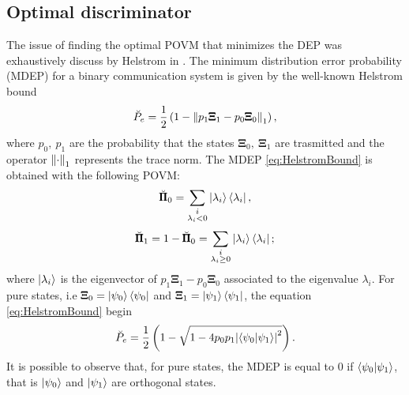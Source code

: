     \subsection{Optimal discriminator}
    The issue of finding the optimal POVM that minimizes the DEP was exhaustively discuss  by Helstrom in 
    \cite{helstrom3,helstrom4}. The minimum distribution error probability (MDEP) for a binary 
    communication system is given by the well-known Helstrom bound
    \begin{equation}
        \breve{P}_e = \frac{1}{2} \left(1-\norm{p_1 \pmb{\Xi}_1 - p_0 \pmb{\Xi}_0}_1 \right),
        \label{eq:HelstromBound}
    \end{equation}
    where $p_0,\ p_1$ are the probability that the states $\pmb{\Xi}_0,\ \pmb{\Xi}_1$ are trasmitted
    and the operator $\norm{\cdot}_1$ represents the trace norm. 
    The MDEP \ref{eq:HelstromBound} is obtained with the following POVM:
    \begin{equation}
        \breve{\pmb{\Pi}}_0 = \sum_{\substack{i \\ \lambda_i<0}} \ket{\lambda_i}\bra{\lambda_i},
    \end{equation}
    \begin{equation*}
        \breve{\pmb{\Pi}}_1 = 1-\breve{\pmb{\Pi}}_0 = 
        \sum_{\substack{i \\ \lambda_i \geq 0}} \ket{\lambda_i}\bra{\lambda_i};
    \end{equation*}
    where $\ket{\lambda_i}$ is the eigenvector of $p_1 \pmb{\Xi}_1 - p_0 \pmb{\Xi}_0$ associated to 
    the eigenvalue $\lambda_i$.
    For pure states, i.e $\pmb{\Xi}_0 = \ket{\psi_0}\bra{\psi_0}$ and $\pmb{\Xi}_1 = \ket{\psi_1}
    \bra{\psi_1}$, the equation \ref{eq:HelstromBound} begin
    \begin{equation}
        \breve{P}_e = \frac{1}{2} \left(1- \sqrt{1-4 p_0 p_1 \absolutevalue{\braket{\psi_0}{\psi_1}}^2}
        \right).
        \label{eq:HelstromBPure}
    \end{equation}
    It is possible to observe that, for pure states, the MDEP is equal to $0$ if $\braket{\psi_0}{\psi_1}$,
    that is $\ket{\psi_0}$ and $\ket{\psi_1}$ are orthogonal states.